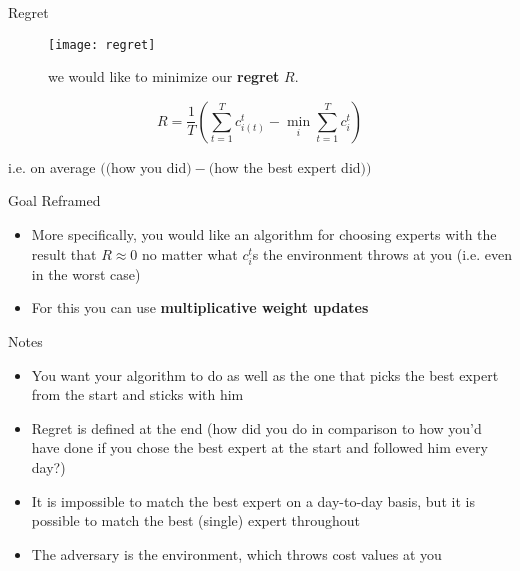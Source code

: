 \documentclass[10pt]{beamer}
\begin{document}
\begin{frame}[fragile]{Regret}

\begin{figure}
  \texttt{[image: regret]}
  \caption{we would like to minimize our \textbf{regret} $R$.}
\end{figure}
\vspace*{-5mm}
$$R = \frac{1}{T}\left(\sum_{t = 1}^T c_{i(t)}^t - \min_i\sum_{t = 1}^T c_i^t\right)$$
\vspace*{-6mm}
\begin{center}
i.e. on average $(($how you did$) - ($how the best expert did$))$
\end{center}

\end{frame}

\begin{frame}[fragile]{Goal Reframed}

\begin{itemize}
\item More specifically, you would like an algorithm for choosing experts with the result that $R \approx 0$ no matter what $c_i^t$s the environment throws at you (i.e. even in the worst case)
\item For this you can use \textbf{multiplicative weight updates}
\end{itemize}

\end{frame}

\begin{frame}[fragile]{Notes}

\begin{itemize}
\item You want your algorithm to do as well as the one that picks the best expert from the start and sticks with him
\item Regret is defined at the end (how did you do in comparison to how you'd have done if you chose the best expert at the start and followed him every day?)
\item It is impossible to match the best expert on a day-to-day basis, but it is possible to match the best (single) expert throughout
\item The adversary is the environment, which throws cost values at you
\end{itemize}

\end{frame}
\end{document}
